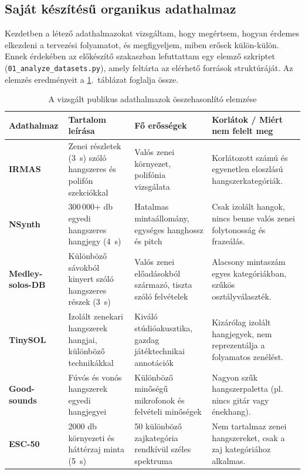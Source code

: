 \subsection{Saját készítésű organikus adathalmaz}
\label{subsec:own_dataset}

Kezdetben a létező adathalmazokat vizsgáltam, hogy megértsem, hogyan érdemes elkezdeni a tervezési folyamatot, és megfigyeljem, miben erősek külön-külön. Ennek érdekében az előkészítő szakaszban lefuttattam egy elemző szkriptet (\texttt{01\_analyze\_\allowbreak datasets.py}), amely feltárta az elérhető források struktúráját. Az elemzés eredményeit a \ref{tab:adathalmaz_osszehasonlitas}.~táblázat foglalja össze.

\begin{table}[H]
\centering
\caption{A vizsgált publikus adathalmazok összehasonlító elemzése}
\label{tab:adathalmaz_osszehasonlitas}
\begin{tabular}{p{2.2cm}p{4.0cm}p{4.0cm}p{3.6cm}}
\toprule
\textbf{Adathalmaz} & \textbf{Tartalom leírása} & \textbf{Fő erősségek} & \textbf{Korlátok / Miért nem felelt meg} \\
\midrule
\textbf{IRMAS}~\cite{bosch2012irmas} & Zenei részletek (3~s) szóló hangszeres és polifón szekciókkal & Valós zenei környezet, polifónia vizsgálata & Korlátozott számú és egyenetlen eloszlású hangszerkategóriák. \\
\addlinespace
\textbf{NSynth}~\cite{engel2017nsynth} & 300\,000+ db egyedi hangszeres hangjegy (4~s) & Hatalmas mintaállomány, egységes hanghossz és pitch & Csak izolált hangok, nincs benne valós zenei folytonosság és frazeálás. \\
\addlinespace
\textbf{Medley-solos-DB}~\cite{lostanlen2018medley} & Különböző sávokból kinyert szóló hangszeres részek (3~s) & Valós zenei előadásokból származó, tiszta szóló felvételek & Alacsony mintaszám egyes kategóriákban, szűkös osztályválaszték. \\
\addlinespace
\textbf{TinySOL}~\cite{cella2020tinysol} & Izolált zenekari hangszerek hangjai, különböző technikákkal & Kiváló stúdióakusztika, gazdag játéktechnikai annotációk & Kizárólag izolált hangjegyek, nem reprezentálja a folyamatos zenélést. \\
\addlinespace
\textbf{Good-sounds}~\cite{romani2015good} & Fúvós és vonós hangszerek egyedi hangjegyei & Különböző minőségű mikrofonok és felvételi minőségek & Nagyon szűk hangszerpaletta (pl. nincs gitár vagy énekhang). \\
\addlinespace
\textbf{ESC-50}~\cite{piczak2015esc} & 2000 db környezeti és háttérzaj minta (5~s) & 50 különböző zajkategória rendkívül széles spektruma & Nem tartalmaz zenei hangszereket, csak a zaj kategóriához alkalmas. \\
\bottomrule
\end{tabular}
\end{table}

